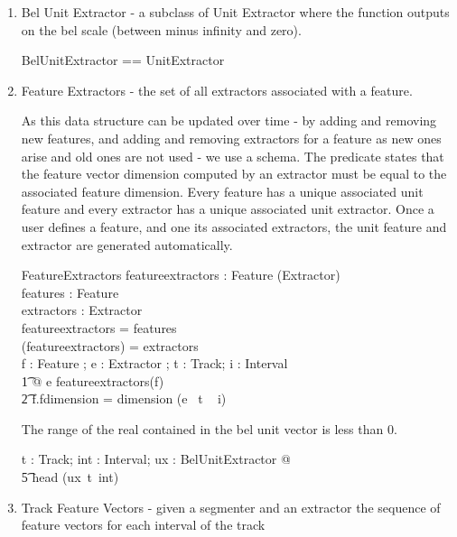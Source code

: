 \documentclass[11pt]{article}
\begin{document}
\begin{enumerate}
\item \textsf{Bel Unit Extractor} - a subclass of Unit Extractor where the function outputs on the bel scale (between minus infinity and zero). 

\begin{zed}
	BelUnitExtractor ==  UnitExtractor
\end{zed}

\item \textsf{Feature Extractors} - the set of  all extractors associated with a feature.

As this data structure can be updated over time -  by adding and removing new features, and adding and removing extractors for a feature as new ones arise and old ones are not used - we use a schema. The  predicate states that the feature vector dimension computed by an extractor must be equal to the associated feature dimension. Every feature has a unique associated unit feature  and every extractor has a unique associated unit extractor. Once a user defines a feature, and one its associated extractors, the unit feature and extractor are generated automatically.  

\begin{schema}{FeatureExtractors}
	featureextractors : Feature \pfun (\power Extractor) \\
	features : \power Feature \\
	extractors : \power Extractor \\
\where
	\dom featureextractors = features \\
	\bigcup (\ran featureextractors) = extractors \\
	\forall f : Feature ; e :  Extractor ; t : Track; i : Interval \\
	\t1 @ e \in featureextractors(f)  \implies  \\
	\t2 f.fdimension = dimension (e~ t ~ i) \\
\end{schema}

The range of the real contained in the bel unit vector is less than 0. 

\begin{zed}
		\forall t : Track; int : Interval; ux : BelUnitExtractor   @  \\
		\t5 head (ux~t~int)  
\end{zed}

\item \textsf{Track Feature Vectors} - given a segmenter and an extractor the  sequence of feature vectors  for each interval of the track 


\end{enumerate}
\end{document}
